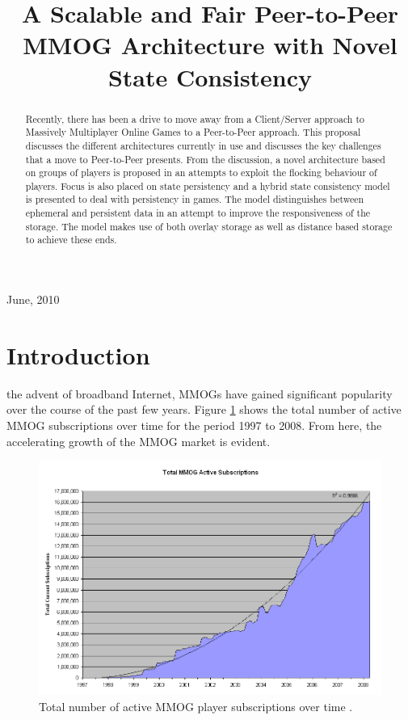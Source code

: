\documentclass[journal,oneside,a4paper,onecolumn]{IEEEtran}
\begin{document}
%
\title{A Scalable and Fair Peer-to-Peer MMOG Architecture with Novel State Consistency}

\author{
}

\maketitle

\begin{abstract}
Recently, there has been a drive to move away from a Client/Server approach to Massively Multiplayer Online Games to a Peer-to-Peer approach. This proposal discusses the different architectures currently in use and discusses the key challenges that a move to Peer-to-Peer presents. From the discussion, a novel architecture based on groups of players is proposed in an attempts to exploit the flocking behaviour of players. Focus is also placed on state persistency and a hybrid state consistency model is presented to deal with persistency in games. The model distinguishes between ephemeral and persistent data in an attempt to improve the responsiveness of the storage. The model makes use of both overlay storage as well as distance based storage to achieve these ends.
\end{abstract}

\hfill June, 2010

\section{Introduction}


 the advent of broadband Internet, \acp{MMOG} have gained significant popularity over the course of the past few years.
Figure \ref{fig_mmog_subscriptions} shows the total number of active MMOG subscriptions over time for the period 1997 to 2008. From here, the accelerating growth of the MMOG market is evident.
%
\begin{figure}[htbp]
 \centering
 \includegraphics[width=0.7\columnwidth]{MMOG_subscriptions}
 \caption{Total number of active MMOG player subscriptions over time \cite{mmo_growth_chart}.}
 \label{fig_mmog_subscriptions}
\end{figure}
\end{document}
